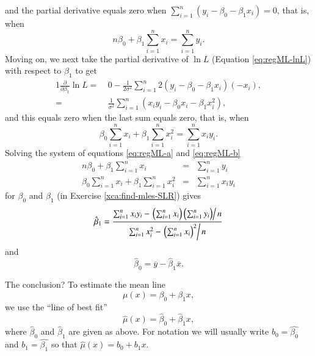 \documentclass[captions=tableheading]{scrbook}
\begin{document}
and the partial derivative equals zero when \( \sum_{i=1}^{n}(y_{i}-\beta_{0}-\beta_{1}x_{i}) = 0 \), that is, when
\begin{equation}
n \beta_{0} + \beta_{1} \sum_{i=1}^{n} x_{i} = \sum_{i = 1}^{n}y_{i}.\label{eq:regML-a}
\end{equation}
Moving on, we next take the partial derivative of \( \ln L \) (Equation \ref{eq:regML-lnL}) with respect to \( \beta_{1} \) to get
\begin{alignat}{1}
\frac{\partial}{\partial\beta_{1}}\ln L=\  & 0-\frac{1}{2\sigma^{2}}\sum_{i=1}^{n}2(y_{i}-\beta_{0}-\beta_{1}x_{i})(-x_{i}),\\
= & \frac{1}{\sigma^{2}}\sum_{i=1}^{n}\left(x_{i}y_{i}-\beta_{0}x_{i}-\beta_{1}x_{i}^{2}\right),
\end{alignat}
and this equals zero when the last sum equals zero, that is, when
\begin{equation}
\beta_{0} \sum_{i = 1}^{n}x_{i} + \beta_{1} \sum_{i = 1}^{n}x_{i}^{2} = \sum_{i = 1}^{n}x_{i}y_{i}.\label{eq:regML-b}
\end{equation}
Solving the system of equations \ref{eq:regML-a} and \ref{eq:regML-b}
\begin{eqnarray}
n\beta_{0} + \beta_{1}\sum_{i = 1}^{n}x_{i} & = & \sum_{i = 1}^{n}y_{i}\\
\beta_{0}\sum_{i = 1}^{n}x_{i}+\beta_{1}\sum_{i = 1}^{n}x_{i}^{2} & = & \sum_{i = 1}^{n}x_{i}y_{i}
\end{eqnarray}
for \( \beta_{0} \) and \( \beta_{1} \) (in Exercise \ref{xca:find-mles-SLR}) gives
\begin{equation}
\hat{\beta}_{1} = \frac{\sum_{i = 1}^{n}x_{i}y_{i} - \left.\left(\sum_{i = 1}^{n}x_{i}\right)\left(\sum_{i = 1}^{n}y_{i}\right)\right\slash n}{\sum_{i = 1}^{n}x_{i}^{2} - \left.\left(\sum_{i = 1}^{n}x_{i}\right)^{2}\right\slash n}\label{eq:regline-slope-formula}
\end{equation}
and
\begin{equation}
\hat{\beta}_{0} = \overline{y} - \hat{\beta}_{1}\overline{x}.
\end{equation}

The conclusion? To estimate the mean line 
\begin{equation}
\mu(x) = \beta_{0} + \beta_{1}x,
\end{equation}
we use the ``line of best fit''
\begin{equation}
\hat{\mu}(x) = \hat{\beta}_{0} + \hat{\beta}_{1}x,
\end{equation}
where \(\hat{\beta}_{0}\) and \(\hat{\beta}_{1}\) are given as above. For notation we will usually write \( b_{0} = \hat{\beta_{0}} \) and \( b_{1}=\hat{\beta_{1}} \) so that \( \hat{\mu}(x) = b_{0} + b_{1}x \).
\end{document}
